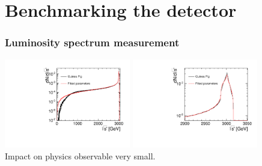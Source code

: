 \documentclass{beamer}
\begin{document}
\section{Benchmarking the detector}
\begin{frame}
\frametitle{Luminosity spectrum measurement}
\includegraphics[width=5.5cm]{Spectra_BHWide_noEsmearing_full.pdf}
\includegraphics[width=5.5cm]{Spectra_BHWide_noEsmearing_zoom.pdf}\\
Impact on physics observable very small.
\end{frame}
\end{document}
